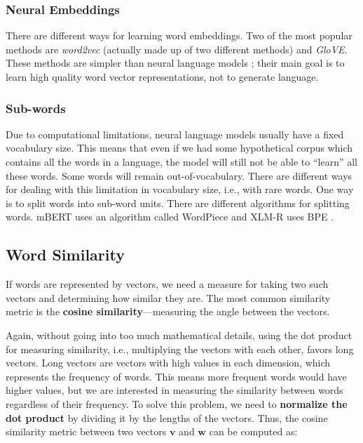 \subsubsection{Neural Embeddings}

There are different ways for learning word embeddings. 
Two of the most popular methods are \emph{word2vec} (actually made up of two different methods) and \emph{GloVE}. 
These methods are simpler than neural language models \autocite[111]{jurafsky-2019}; their main goal is to learn high quality word vector representations, not to generate language.

\subsubsection{Sub-words}\label{sec:subwords}
Due to computational limitations, neural language models usually have a fixed vocabulary size. 
This means that even if we had some hypothetical corpus which contains all the words in a language, the model will still not be able to \enquote{learn} all these words. 
Some words will remain out-of-vocabulary.
There are different ways for dealing with this limitation in vocabulary size, i.e., with rare words. 
One way is to split words into sub-word units. 
There are different algorithms for splitting words. 
mBERT uses an algorithm called WordPiece \autocites{wu-2016-wordpiece,delvin-chang-2018-bert} and XLM-R uses BPE \autocites{conneau-etal-2020-xlm,sennrich-etal-2016-neural}.


\subsection{Word Similarity}
\label{sec:word-similarity}
If words are represented by vectors, we need a measure for taking two such vectors and determining how similar they are. 
The most common similarity metric is the \textbf{cosine similarity}---measuring the angle between the vectors. 

Again, without going into too much mathematical details, using the dot product for measuring similarity, i.e., multiplying the vectors with each other, favors long vectors. Long vectors are vectors with high values in each dimension, which represents the frequency of words. 
This means more frequent words would have higher values, but we are interested in measuring the similarity between words regardless of their frequency.
To solve this problem, we need to \textbf{normalize the dot product} by dividing it by the lengths of the vectors. 
Thus, the cosine similarity metric between two vectors $\mathbf{v}$ and $\mathbf{w}$ can be computed as:


